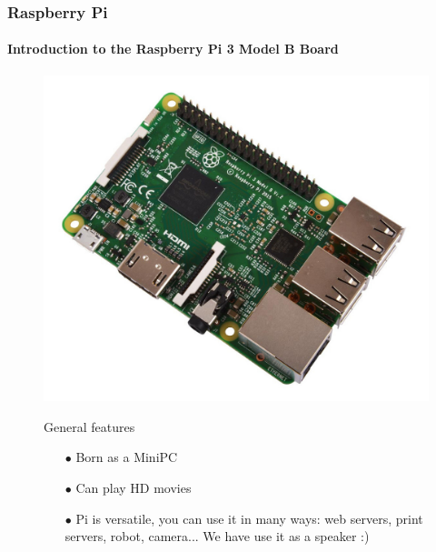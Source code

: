 \documentclass{beamer}
\begin{document}
\begin{frame}
\frametitle{\textbf{Raspberry Pi}}
\framesubtitle{\textbf{Introduction to the Raspberry Pi 3 Model B Board}}
\begin{figure}
\centering
\includegraphics[scale=0.15]{imgs/rasp3b.jpg}
\begin{block}{General features}
\begin{itemize}
\item[$\bullet$] Born as a MiniPC
\item[$\bullet$] Can play HD movies
\item[$\bullet$] Pi is versatile, you can use it in many ways: web servers, print servers, robot, camera... We have use it as a speaker :)
\end{itemize}
\end{block}
\end{figure}
\end{frame}

\end{document}
